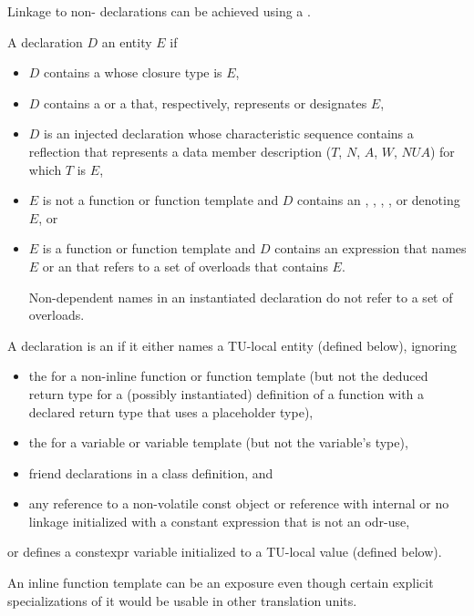 \pnum
\begin{note}
Linkage to non-\Cpp{} declarations can be achieved using a
.
\end{note}

\pnum
A declaration $D$  an entity $E$ if
\begin{itemize}
\item
$D$ contains a  whose closure type is $E$,
\item
$D$ contains
a  or a 
that, respectively, represents or designates $E$,
\item
$D$ is an injected declaration
whose characteristic sequence contains a reflection
that represents
a data member description ($T$, $N$, $A$, $W$, $\mathit{NUA}$)
for which $T$ is $E$,
\item
$E$ is not a function or function template and $D$ contains an
,
,
,
, or
denoting $E$, or
\item
$E$ is a function or function template and
$D$ contains an expression that names $E$ or
an 
that refers to a set of overloads that contains $E$.
\begin{note}
Non-dependent names in an instantiated declaration
do not refer to a set of overloads.
\end{note}
\end{itemize}

\pnum
A declaration is an 
if it either names a TU-local entity (defined below), ignoring
\begin{itemize}
\item
the 
for a non-inline function or function template
(but not the deduced return type
for a (possibly instantiated) definition of a function
with a declared return type that uses a placeholder type),
\item
the 
for a variable or variable template (but not the variable's type),
\item
friend declarations in a class definition, and
\item
any reference to a non-volatile const object or reference
with internal or no linkage initialized with a constant expression
that is not an odr-use,
\end{itemize}
or defines a constexpr variable initialized to a TU-local value (defined below).
\begin{note}
An inline function template can be an exposure even though
certain explicit specializations of it would be usable in other translation units.
\end{note}

